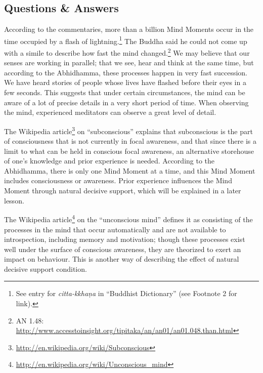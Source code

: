 \newpage

\subsection*{Questions \& Answers}


According to the commentaries, more than a billion Mind Moments occur in the time occupied by a flash of lightning.\footnote{See entry for \textit{citta-kkhaṇa} in “Buddhist Dictionary” (see Footnote 2 for link).} The Buddha said he could not come up with a simile to describe how fast the mind changed.\footnote{AN 1.48: \url{http://www.accesstoinsight.org/tipitaka/an/an01/an01.048.than.html}} We may believe that our senses are working in parallel; that we see, hear and think at the same time, but according to the Abhidhamma, these processes happen in very fast succession. We have heard stories of people whose lives have flashed before their eyes in a few seconds. This suggests that under certain circumstances, the mind can be aware of a lot of precise details in a very short period of time. When observing the mind, experienced meditators can observe a great level of detail.


The Wikipedia article\footnote{\url{http://en.wikipedia.org/wiki/Subconscious}} on “subconscious” explains that subconscious is the part of consciousness that is not currently in focal awareness, and that since there is a limit to what can be held in conscious focal awareness, an alternative storehouse of one’s knowledge and prior experience is needed. According to the Abhidhamma, there is only one Mind Moment at a time, and this Mind Moment includes consciousness or awareness. Prior experience influences the Mind Moment through natural decisive support, which will be explained in a later lesson.

The Wikipedia article\footnote{\url{http://en.wikipedia.org/wiki/Unconscious_mind}} on the “unconscious mind” defines it as consisting of the processes in the mind that occur automatically and are not available to introspection, including memory and motivation; though these processes exist well under the surface of conscious awareness, they are theorized to exert an impact on behaviour. This is another way of describing the effect of natural decisive support condition.

